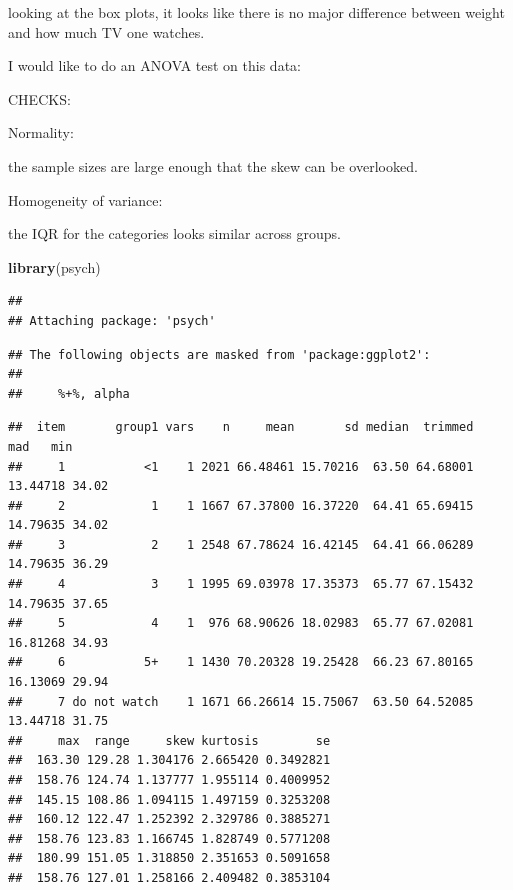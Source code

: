 \documentclass[
]{article}
\newenvironment{Shaded}{\begin{snugshade}}{\end{snugshade}}
\newcommand{\DataTypeTok}[1]{\textcolor[rgb]{0.13,0.29,0.53}{#1}}
\newcommand{\KeywordTok}[1]{\textcolor[rgb]{0.13,0.29,0.53}{\textbf{#1}}}
\newcommand{\NormalTok}[1]{#1}
\newcommand{\OperatorTok}[1]{\textcolor[rgb]{0.81,0.36,0.00}{\textbf{#1}}}
\newcommand{\OtherTok}[1]{\textcolor[rgb]{0.56,0.35,0.01}{#1}}
\begin{document}
looking at the box plots, it looks like there is no major difference
between weight and how much TV one watches.

I would like to do an ANOVA test on this data:

CHECKS:

Normality:

the sample sizes are large enough that the skew can be overlooked.

Homogeneity of variance:

the IQR for the categories looks similar across groups.

\begin{Shaded}
\begin{Highlighting}[]
\KeywordTok{library}\NormalTok{(psych)}
\end{Highlighting}
\end{Shaded}

\begin{verbatim}
## 
## Attaching package: 'psych'
\end{verbatim}

\begin{verbatim}
## The following objects are masked from 'package:ggplot2':
## 
##     %+%, alpha
\end{verbatim}

\begin{Shaded}
\end{Shaded}

\begin{verbatim}
##  item       group1 vars    n     mean       sd median  trimmed      mad   min
##     1           <1    1 2021 66.48461 15.70216  63.50 64.68001 13.44718 34.02
##     2            1    1 1667 67.37800 16.37220  64.41 65.69415 14.79635 34.02
##     3            2    1 2548 67.78624 16.42145  64.41 66.06289 14.79635 36.29
##     4            3    1 1995 69.03978 17.35373  65.77 67.15432 14.79635 37.65
##     5            4    1  976 68.90626 18.02983  65.77 67.02081 16.81268 34.93
##     6           5+    1 1430 70.20328 19.25428  66.23 67.80165 16.13069 29.94
##     7 do not watch    1 1671 66.26614 15.75067  63.50 64.52085 13.44718 31.75
##     max  range     skew kurtosis        se
##  163.30 129.28 1.304176 2.665420 0.3492821
##  158.76 124.74 1.137777 1.955114 0.4009952
##  145.15 108.86 1.094115 1.497159 0.3253208
##  160.12 122.47 1.252392 2.329786 0.3885271
##  158.76 123.83 1.166745 1.828749 0.5771208
##  180.99 151.05 1.318850 2.351653 0.5091658
##  158.76 127.01 1.258166 2.409482 0.3853104
\end{verbatim}
\end{document}
